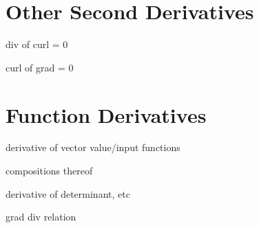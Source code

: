 \section{Other Second Derivatives}
\label{section:other_second_derivatives}

div of curl = 0

curl of grad = 0

\section{Function Derivatives}
\label{section:function_derivatives}

derivative of vector value/input functions

compositions thereof

derivative of determinant, etc

grad div relation